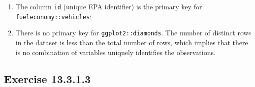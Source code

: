\documentclass[]{book}
\newenvironment{Shaded}{\begin{snugshade}}{\end{snugshade}}
\newcommand{\CommentTok}[1]{\textcolor[rgb]{0.56,0.35,0.01}{\textit{#1}}}
\newcommand{\DecValTok}[1]{\textcolor[rgb]{0.00,0.00,0.81}{#1}}
\newcommand{\KeywordTok}[1]{\textcolor[rgb]{0.13,0.29,0.53}{\textbf{#1}}}
\newcommand{\NormalTok}[1]{#1}
\newcommand{\OperatorTok}[1]{\textcolor[rgb]{0.81,0.36,0.00}{\textbf{#1}}}
\newcommand{\StringTok}[1]{\textcolor[rgb]{0.31,0.60,0.02}{#1}}
\theoremstyle{plain}
\theoremstyle{remark}
\begin{document}
\begin{enumerate}
\begin{Shaded}
\end{Shaded}
\item
  The column \texttt{id} (unique EPA identifier) is the primary key for \texttt{fueleconomy::vehicles}:

\begin{Shaded}
\end{Shaded}
\item
  There is no primary key for \texttt{ggplot2::diamonds}.
  The number of distinct rows in the dataset is less than the total number of rows, which implies that there is no combination of variables uniquely identifies the observations.

\begin{Shaded}
\end{Shaded}
\end{enumerate}

\hypertarget{exercise-13.3.1.3}{%
\subsection*{\texorpdfstring{Exercise {13.3.1.3}}{Exercise 13.3.1.3}}\label{exercise-13.3.1.3}}
\end{document}

